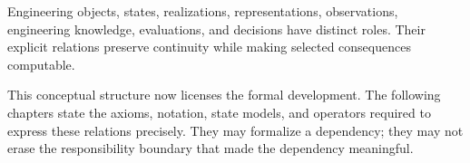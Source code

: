 \begin{proposition}
Engineering objects, states, realizations, representations, observations,
engineering knowledge, evaluations, and decisions have distinct roles. Their
explicit relations preserve continuity while making selected consequences
computable.
\end{proposition}

This conceptual structure now licenses the formal development. The following
chapters state the axioms, notation, state models, and operators required to
express these relations precisely. They may formalize a dependency; they may not
erase the responsibility boundary that made the dependency meaningful.
